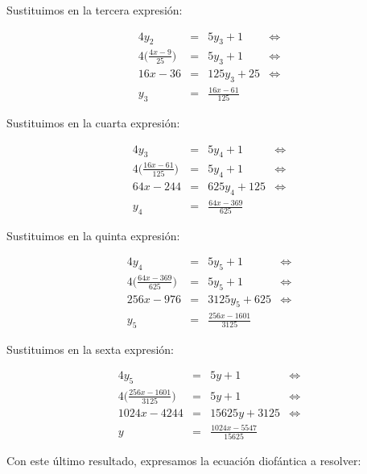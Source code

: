 Sustituimos en la tercera expresión:

\[
\begin{array}{rcll}
	4y_2                       & = & 5y_3 + 1           & \iff \\
	4\big(\frac{4x-9}{25}\big) & = & 5y_3 + 1           & \iff \\
	16x - 36                   & = & 125y_3 + 25        & \iff \\
	y_3                        & = & \frac{16x-61}{125} &
\end{array}
\]

Sustituimos en la cuarta expresión:

\[
\begin{array}{rcll}
	4y_3                          & = & 5y_4 + 1            & \iff \\
	4\big(\frac{16x-61}{125}\big) & = & 5y_4 + 1            & \iff \\
	64x - 244                     & = & 625y_4 + 125        & \iff \\
	y_4                           & = & \frac{64x-369}{625} &
\end{array}
\]

Sustituimos en la quinta expresión:

\[
\begin{array}{rcll}
	4y_4                           & = & 5y_5 + 1               & \iff \\
	4\big(\frac{64x-369}{625}\big) & = & 5y_5 + 1               & \iff \\
	256x - 976                     & = & 3125y_5 + 625          & \iff \\
	y_5                            & = & \frac{256x-1601}{3125} &
\end{array}
\]

Sustituimos en la sexta expresión:

\[
\begin{array}{rcll}
	4y_5                              & = & 5y + 1                   & \iff \\
	4\big(\frac{256x-1601}{3125}\big) & = & 5y + 1                   & \iff \\
	1024x - 4244                      & = & 15625y + 3125            & \iff \\
	y                                 & = & \frac{1024x-5547}{15625} &
\end{array}
\]

Con este último resultado, expresamos la ecuación diofántica a resolver:

